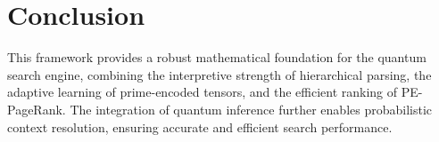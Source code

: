 \documentclass{article}
\theoremstyle{plain}
\theoremstyle{claimstyle}
\begin{document}
\section{Conclusion}
This framework provides a robust mathematical foundation for the quantum search engine, combining the interpretive strength of hierarchical parsing, the adaptive learning of prime-encoded tensors, and the efficient ranking of PE-PageRank. The integration of quantum inference further enables probabilistic context resolution, ensuring accurate and efficient search performance.

\nocite{*}


\end{document}
